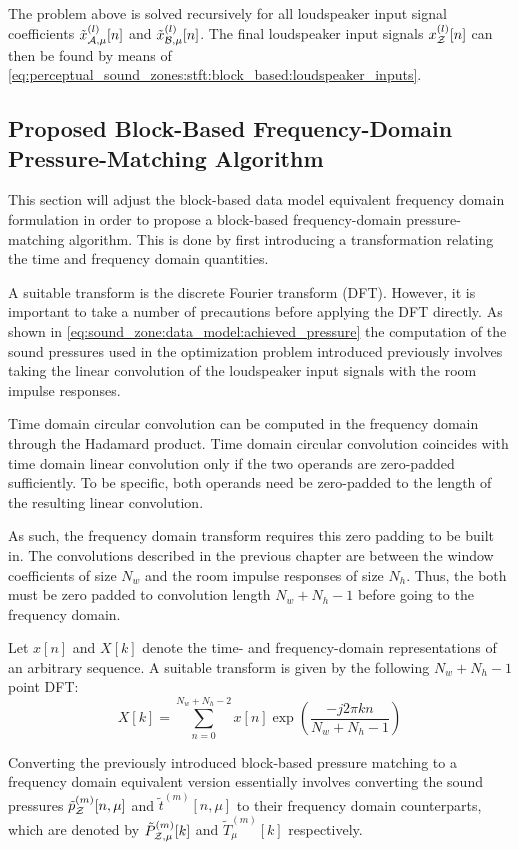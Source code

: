 The problem above is solved recursively for all loudspeaker input signal coefficients $\tilde{x}_{\mathcal{A},\mu}^{(l)}[n]$ and $\tilde{x}_{\mathcal{B},\mu}^{(l)}[n]$.
The final loudspeaker input signals $x_{\mathcal{Z}}^{(l)}[n]$  can then be found by means of \autoref{eq:perceptual_sound_zones:stft:block_based:loudspeaker_inputs}.

\subsection{Proposed Block-Based Frequency-Domain Pressure-Matching Algorithm}
\label{ch:perceptual_sound_zones:stft:stft_pm}
This section will adjust the block-based data model equivalent frequency domain formulation in order to propose a block-based frequency-domain
pressure-matching algorithm.
This is done by first introducing a transformation relating the time and frequency domain quantities.

A suitable transform is the discrete Fourier transform (DFT).
However, it is important to take a number of precautions before applying the DFT directly.
As shown in \autoref{eq:sound_zone:data_model:achieved_pressure} the computation of the sound pressures used in the optimization 
problem introduced previously involves taking the 
linear convolution of the loudspeaker input signals with the room impulse responses.

Time domain circular convolution can be computed in the frequency domain through the Hadamard product.
Time domain circular convolution coincides with time domain linear convolution only if the two operands are zero-padded sufficiently.
To be specific, both operands need be zero-padded to the length of the resulting linear convolution.

As such, the frequency domain transform requires this zero padding to be built in.
The convolutions described in the previous chapter are between the window coefficients of size $N_w$ 
and the room impulse responses of size $N_h$.
Thus, the both must be zero padded to convolution length $N_w + N_h - 1$ before going to the frequency domain.

Let $x[n]$ and $X[k]$ denote the time- and frequency-domain representations of an arbitrary sequence.  
A suitable transform is given by the following $N_w + N_h - 1$ point DFT:
\begin{equation}
    X[k] = \sum_{n=0}^{N_w + N_h - 2} x[n]\exp\left(\frac{-j2\pi k n}{N_w + N_h - 1}\right)
\end{equation}

Converting the previously introduced block-based pressure matching to a frequency domain equivalent version
essentially involves converting the sound pressures $\tilde{p}_{\mathcal{Z}}^{(m)}[n,\mu]$ and $\tilde{t}^{(m)}[n,\mu]$ 
to their frequency domain counterparts, which are denoted by $\tilde{P}_{\mathcal{Z},\mu}^{(m)}[k]$ and $\tilde{T}_\mu^{(m)}[k]$ respectively.

